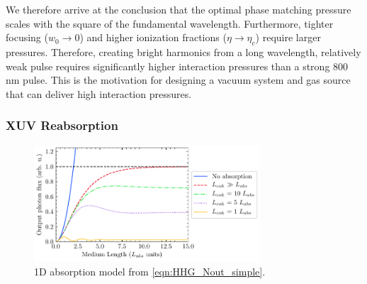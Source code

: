 We therefore arrive at the conclusion that the optimal phase matching pressure scales with the square of the fundamental wavelength. Furthermore, tighter focusing ($w_0 \rightarrow 0$) and higher ionization fractions ($\eta \rightarrow \eta_c$) require larger pressures. Therefore, creating bright harmonics from a long wavelength, relatively weak pulse requires significantly higher interaction pressures than a strong 800 nm pulse. This is the motivation for designing a vacuum system and gas source that can deliver high interaction pressures.

\subsubsection{XUV Reabsorption}
\label{sec:XUV_reabsorption}

\begin{figure}
	\centering
	\includegraphics[width=0.75\textwidth]{figures/chap1/Constant1999_fig1.pdf}
	\caption{1D absorption model from \cref{eqn:HHG_Nout_simple}.}
	\label{fig:Constant1999_fig1}
\end{figure}

